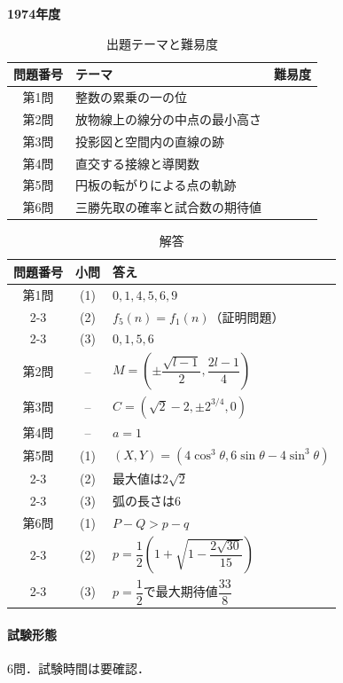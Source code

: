 \documentclass[../../main.tex]{subfiles}
\begin{document}
\begin{center}
  {\fontsize{48pt}{58pt}\selectfont \textbf{1974}\normalsize\textbf{年度}}
\end{center}

\begin{table}[htb]
  \centering
  \caption{出題テーマと難易度}
  \begin{tabular}{|c|p{9cm}|c|}
    \hline
    \textbf{問題番号} & \textbf{テーマ} & \textbf{難易度} \\
    \hline
    第1問 & 整数の累乗の一の位 & \\
    \hline
    第2問 & 放物線上の線分の中点の最小高さ & \\
    \hline
    第3問 & 投影図と空間内の直線の跡 & \\
    \hline
    第4問 & 直交する接線と導関数 & \\
    \hline
    第5問 & 円板の転がりによる点の軌跡 & \\
    \hline
    第6問 & 三勝先取の確率と試合数の期待値 & \\
    \hline
  \end{tabular}
\end{table}

\begin{table}[htb]
  \centering
  \caption{解答}
  \renewcommand{\arraystretch}{1.4}
  \begin{tabular}{|c|c|p{9cm}|}
    \hline
    \textbf{問題番号} & \textbf{小問} & \textbf{答え} \\
    \hline
    第1問 & (1) & $0,1,4,5,6,9$ \\
    \cline{2-3}
    & (2) & $f_5(n)=f_1(n)$（証明問題） \\
    \cline{2-3}
    & (3) & $0,1,5,6$ \\
    \hline
    第2問 & -- & $M=\left(\pm\dfrac{\sqrt{l-1}}{2},\dfrac{2l-1}{4}\right)$ \\
    \hline
    第3問 & -- & $C=\left(\sqrt{2}-2,\pm2^{3/4},0\right)$ \\
    \hline
    第4問 & -- & $a=1$ \\
    \hline
    第5問 & (1) & $(X,Y)=\left(4\cos^3\theta,6\sin\theta-4\sin^3\theta\right)$ \\
    \cline{2-3}
    & (2) & 最大値は$2\sqrt{2}$ \\
    \cline{2-3}
    & (3) & 弧の長さは$6$ \\
    \hline
    第6問 & (1) & $P-Q>p-q$ \\
    \cline{2-3}
    & (2) & $p=\dfrac{1}{2}\left(1+\sqrt{1-\dfrac{2\sqrt{30}}{15}}\right)$ \\
    \cline{2-3}
    & (3) & $p=\dfrac{1}{2}$で最大期待値$\dfrac{33}{8}$ \\
    \hline
  \end{tabular}
\end{table}

\paragraph{試験形態}
6問．試験時間は要確認．
\end{document}
